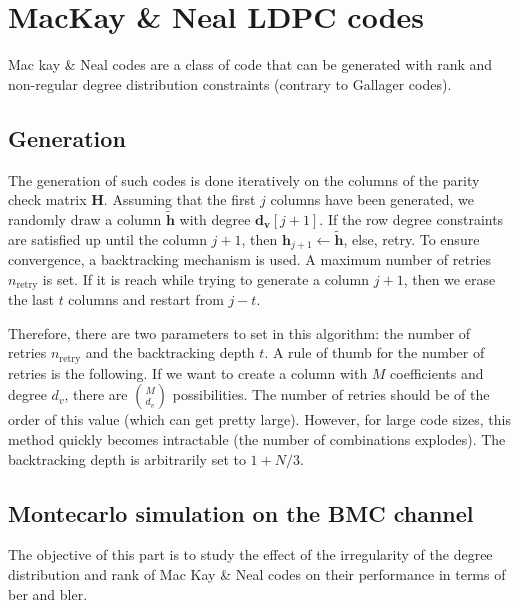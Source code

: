 \section{MacKay \& Neal LDPC codes}
Mac kay \& Neal codes are a class of code that can be generated with rank and
non-regular degree distribution constraints (contrary to Gallager codes).

\subsection{Generation}
The generation of such codes is done iteratively on the columns of the parity
check matrix $\bm{H}$. Assuming that the first $j$ columns have been generated,
we randomly draw a column $\bm{\tilde{h}}$ with degree $\bm{d_v}[j+1]$. If the
row degree constraints are satisfied up until the column $j+1$, then
$\bm{h}_{j+1} \leftarrow \bm{\tilde{h}}$, else, retry. To ensure convergence, a
backtracking mechanism is used. A maximum number of retries $n_\text{retry}$ is
set. If it is reach while trying to generate a column $j + 1$, then we erase the
last $t$ columns and restart from $j - t$.

Therefore, there are two parameters to set in this algorithm: the number of
retries $n_\text{retry}$ and the backtracking depth $t$. A rule of thumb for the
number of retries is the following. If we want to create a column with $M$
coefficients and degree $d_v$, there are $\binom{M}{d_v}$ possibilities. The
number of retries should be of the order of this value (which can get pretty
large). However, for large code sizes, this method quickly becomes intractable
(the number of combinations explodes). The backtracking depth is arbitrarily set
to $1 + N/3$.

\subsection{Montecarlo simulation on the BMC channel}

The objective of this part is to study the effect of the irregularity of the
degree distribution and rank of Mac Kay \& Neal codes on their performance in
terms of \acrshort{ber} and \acrshort{bler}.

